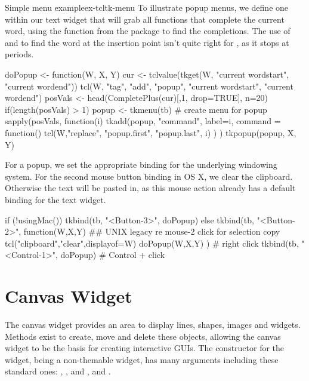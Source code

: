 \begin{example}{Simple menu example}{ex-tcltk-menu}
To illustrate popup menus, we define one within our text widget that will grab all
functions that complete the current word, using the
 function from the  package to find
the completions.  The use of  and
 to find the word at the insertion point isn't quite
right for \R, as it stops at periods.
\begin{Schunk}
\begin{Sinput}
 doPopup <- function(W, X, Y) {
   cur <- tclvalue(tkget(W, "current  wordstart", 
                            "current wordend"))
   tcl(W, "tag", "add", "popup", "current  wordstart", 
                                 "current wordend")
   posVals <- head(CompletePlus(cur)[,1, drop=TRUE], n=20)
   if(length(posVals) > 1) {
     popup <- tkmenu(tb)                # create menu for popup
     sapply(posVals, function(i) {         
       tkadd(popup, "command", label=i, command = function() {
         tcl(W,"replace", "popup.first", "popup.last", i)
       })
     })
     tkpopup(popup, X, Y)
  }}
\end{Sinput}
\end{Schunk}

For a popup, we set the appropriate binding for the underlying
windowing system. For the second mouse button binding in OS X, we
clear the clipboard. Otherwise the text  will be pasted in, as this mouse
action already has a default binding for the text widget.

\begin{Schunk}
\begin{Sinput}
 if (!usingMac()) {
   tkbind(tb, "<Button-3>", doPopup)
 } else {
   tkbind(tb, "<Button-2>", function(W,X,Y) {
     ## UNIX legacy re mouse-2 click for selection copy
     tcl("clipboard","clear",displayof=W) 
     doPopup(W,X,Y)
     })      # right click
   tkbind(tb, "<Control-1>", doPopup)     # Control + click
 }
\end{Sinput}
\end{Schunk}
\end{example}

\section{Canvas Widget}
\label{sec:tcltk:canvas-widget}

 
The canvas widget provides an area to display lines, shapes, images
and widgets. Methods exist to create, move and delete these objects,
allowing the canvas widget to be the basis for creating interactive
GUIs. The constructor  for the widget, being a
non-themable widget, has many arguments including these standard ones:
, , and
, 
and .



